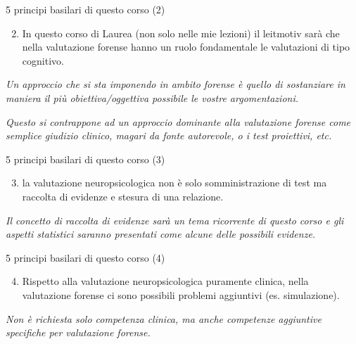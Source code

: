 \documentclass[
  ignorenonframetext,
  aspectratio=169,
]{beamer}
\providecommand{\tightlist}{%
  \setlength{\itemsep}{0pt}\setlength{\parskip}{0pt}}
\begin{document}
\begin{frame}{5 principi basilari di questo corso (2)}
\label{principi-basilari-di-questo-corso-2}
\begin{enumerate}
\setcounter{enumi}{1}
\tightlist
\item
  In questo corso di Laurea (non solo nelle mie lezioni) il leitmotiv
  sarà che nella valutazione forense hanno un ruolo fondamentale le
  valutazioni di tipo cognitivo.
\end{enumerate}

\vspace{3em}

\emph{Un approccio che si sta imponendo in ambito forense è quello di
sostanziare in maniera il più obiettiva/oggettiva possibile le vostre
argomentazioni.}

\emph{Questo si contrappone ad un approccio dominante alla valutazione
forense come semplice giudizio clinico, magari da fonte autorevole, o i
test proiettivi, etc.}
\end{frame}

\begin{frame}{5 principi basilari di questo corso (3)}
\label{principi-basilari-di-questo-corso-3}
\begin{enumerate}
\setcounter{enumi}{2}
\tightlist
\item
  la valutazione neuropsicologica non è solo somministrazione di test ma
  raccolta di evidenze e stesura di una relazione.
\end{enumerate}

\vspace{3em}

\emph{Il concetto di raccolta di evidenze sarà un tema ricorrente di
questo corso e gli aspetti statistici saranno presentati come alcune
delle possibili evidenze.}
\end{frame}

\begin{frame}{5 principi basilari di questo corso (4)}
\label{principi-basilari-di-questo-corso-4}
\begin{enumerate}
\setcounter{enumi}{3}
\tightlist
\item
  Rispetto alla valutazione neuropsicologica puramente clinica, nella
  valutazione forense ci sono possibili problemi aggiuntivi (es.
  simulazione). \vspace{3em}
\end{enumerate}

\emph{Non è richiesta solo competenza clinica, ma anche competenze
aggiuntive specifiche per valutazione forense.}
\end{frame}
\end{document}
